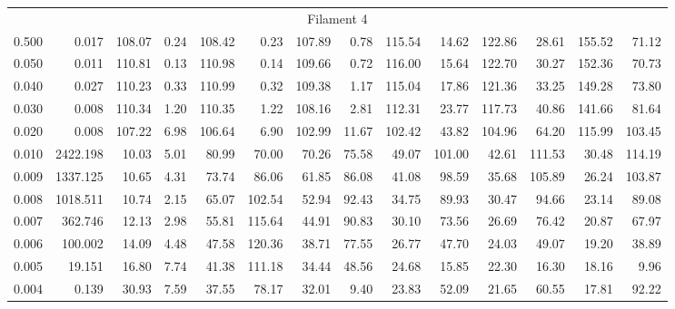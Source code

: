 \begin{tabular}{@{}lrrrrrrrrrrrrr@{}}
\midrule
\multicolumn{14}{c}{Filament 4} \\
\cmidrule{1-14}
0.500 & 0.017 & 108.07 & 0.24 & 108.42 & 0.23 & 107.89 & 0.78 & 115.54 & 14.62 & 122.86 & 28.61 & 155.52 & 71.12 \\
0.050 & 0.011 & 110.81 & 0.13 & 110.98 & 0.14 & 109.66 & 0.72 & 116.00 & 15.64 & 122.70 & 30.27 & 152.36 & 70.73 \\
0.040 & 0.027 & 110.23 & 0.33 & 110.99 & 0.32 & 109.38 & 1.17 & 115.04 & 17.86 & 121.36 & 33.25 & 149.28 & 73.80 \\
0.030 & 0.008 & 110.34 & 1.20 & 110.35 & 1.22 & 108.16 & 2.81 & 112.31 & 23.77 & 117.73 & 40.86 & 141.66 & 81.64 \\
0.020 & 0.008 & 107.22 & 6.98 & 106.64 & 6.90 & 102.99 & 11.67 & 102.42 & 43.82 & 104.96 & 64.20 & 115.99 & 103.45 \\
0.010 & 2422.198 & 10.03 & 5.01 & 80.99 & 70.00 & 70.26 & 75.58 & 49.07 & 101.00 & 42.61 & 111.53 & 30.48 & 114.19 \\
0.009 & 1337.125 & 10.65 & 4.31 & 73.74 & 86.06 & 61.85 & 86.08 & 41.08 & 98.59 & 35.68 & 105.89 & 26.24 & 103.87 \\
0.008 & 1018.511 & 10.74 & 2.15 & 65.07 & 102.54 & 52.94 & 92.43 & 34.75 & 89.93 & 30.47 & 94.66 & 23.14 & 89.08 \\
0.007 & 362.746 & 12.13 & 2.98 & 55.81 & 115.64 & 44.91 & 90.83 & 30.10 & 73.56 & 26.69 & 76.42 & 20.87 & 67.97 \\
0.006 & 100.002 & 14.09 & 4.48 & 47.58 & 120.36 & 38.71 & 77.55 & 26.77 & 47.70 & 24.03 & 49.07 & 19.20 & 38.89 \\
0.005 & 19.151 & 16.80 & 7.74 & 41.38 & 111.18 & 34.44 & 48.56 & 24.68 & 15.85 & 22.30 & 16.30 & 18.16 & 9.96 \\
0.004 & 0.139 & 30.93 & 7.59 & 37.55 & 78.17 & 32.01 & 9.40 & 23.83 & 52.09 & 21.65 & 60.55 & 17.81 & 92.22 \\


\end{tabular}
